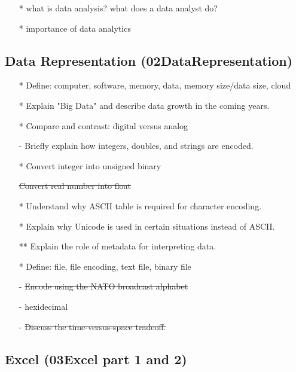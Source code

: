 \documentclass{article}%
\begin{document}
\begin{itemize}
\item[*]  what is data analysis? what does a data analyst do?
\item[*] importance of data analytics
\end{itemize}



\subsection{Data Representation (02DataRepresentation)}

\begin{itemize}
\item[*]Define: computer, software, memory, data, memory size/data size, cloud
\item[*]Explain "Big Data" and describe data growth in the coming years.
\item[*] Compare and contrast: digital versus analog
  \item[-] Briefly explain how integers, doubles, and strings are encoded.
\item[*] Convert integer into unsigned binary
\item[] \sout{Convert real number into float}
\item[*] Understand why ASCII table is required for character encoding.
\item[*] Explain why Unicode is used in certain situations instead of ASCII.
\item[**] Explain the role of metadata for interpreting data.
\item[*] Define: file, file encoding, text file, binary file
   \item [-] \sout{Encode using the NATO broadcast alphabet}
      \item [-] hexidecimal
    \item[-] \sout{Discuss the time-versus-space tradeoff.}

\end{itemize}


 
\subsection{Excel (03Excel part 1 and 2)}
\end{document}
